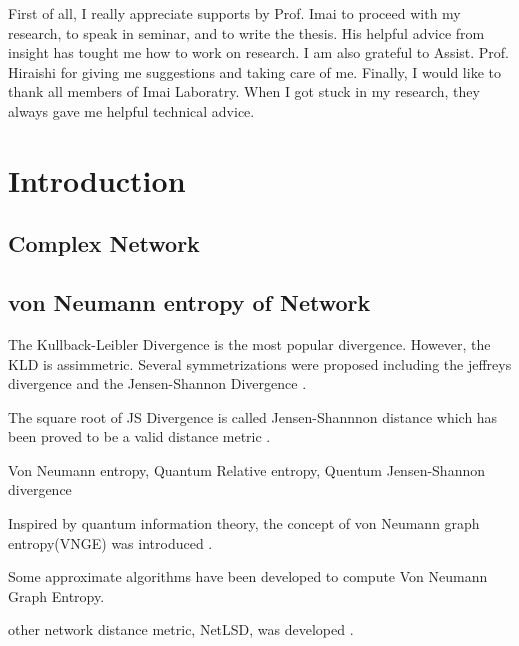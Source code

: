 \documentclass[senior,final,11pt]{iscs-thesis}
\begin{document}
\begin{acknowledge}
    First of all, I really appreciate supports by Prof. Imai to proceed with my
    research, to speak in seminar, and to write the thesis. His helpful advice from insight has tought me how to work on research. I am also grateful to Assist. Prof. Hiraishi for giving me suggestions and taking care of me. Finally, I would like to thank all members of Imai Laboratry. When
    I got stuck in my research, they always gave me helpful technical advice.
\end{acknowledge}

\frontmatter %
\tableofcontents %
\mainmatter %

\chapter{Introduction}
\section{Complex Network}
\section{von Neumann entropy of Network}

The Kullback-Leibler Divergence \cite{kullback1951information} is the most popular divergence.
However, the KLD is assimmetric.
Several symmetrizations \cite{nielsen2019jensen} were proposed including the jeffreys divergence \cite{jeffreys1946invariant} and the Jensen-Shannon Divergence \cite{lin1991divergence}.

The square root of JS Divergence is called Jensen-Shannnon distance which has been proved to be a valid distance metric \cite{endres2003new}.

Von Neumann entropy,
Quantum Relative entropy,
Quentum Jensen-Shannon divergence \cite{briet2009properties, lamberti2008metric}

Inspired by quantum information theory, the concept of von Neumann graph entropy(VNGE) was introduced \cite{braunstein2006laplacian}.

Some approximate algorithms have been developed to compute Von Neumann Graph Entropy\cite{chen2019fast,tsitsulin2020just}.

other network distance metric, NetLSD, was developed \cite{tsitsulin2018netlsd,tsitsulin2020just}.
\end{document}

